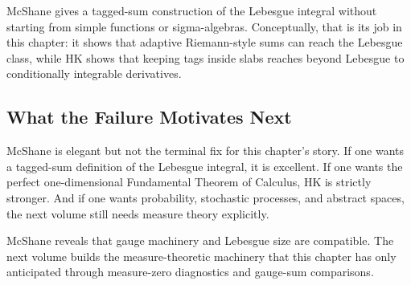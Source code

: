 \begin{remark*}[Interpretation]
McShane gives a tagged-sum construction of the Lebesgue integral without
starting from simple functions or sigma-algebras. Conceptually, that is its
job in this chapter: it shows that adaptive Riemann-style sums can reach the
Lebesgue class, while HK shows that keeping tags inside slabs reaches beyond
Lebesgue to conditionally integrable derivatives.
\end{remark*}

\subsection*{What the Failure Motivates Next}

\begin{remark*}[Interpretation]
McShane is elegant but not the terminal fix for this chapter's story. If one
wants a tagged-sum definition of the Lebesgue integral, it is excellent. If
one wants the perfect one-dimensional Fundamental Theorem of Calculus, HK is
strictly stronger. And if one wants probability, stochastic processes, and
abstract spaces, the next volume still needs measure theory explicitly.
\end{remark*}

\begin{remark*}[Interpretation]
McShane reveals that gauge machinery and Lebesgue size are compatible. The
next volume builds the measure-theoretic machinery that this chapter has only
anticipated through measure-zero diagnostics and gauge-sum comparisons.
\end{remark*}
